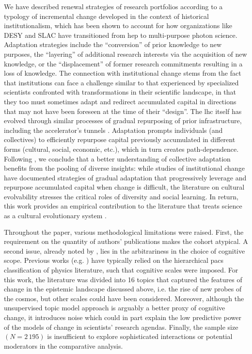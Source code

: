 \documentclass{article}
\begin{document}
We have described renewal strategies of research portfolios according to a typology of incremental change developed in the context of historical institutionalism, which has been shown to account for how organizations like DESY and SLAC have transitioned from \gls{hep} to multi-purpose photon science. Adaptation strategies include the ``conversion'' of prior knowledge to new purposes, the ``layering'' of additional research interests via the acquisition of new knowledge, or the ``displacement'' of former research commitments resulting in a loss of knowledge. The connection with institutional change stems from the fact that institutions can face a challenge similar to that experienced by specialized scientists confronted with transformations in their scientific landscape, in that they too must sometimes adapt and redirect accumulated capital in directions that may not have been foreseen at the time of their ``design''. The \gls{lhc} itself has evolved through similar processes of gradual repurposing of prior infrastructure, including the accelerator's tunnels \citep{Smith2015}. Adaptation prompts individuals (and collectives) to efficiently repurpose capital previously accumulated in different forms (cultural, social, economic, etc.), which in turn creates path-dependence. Following \citealt{Galesic2023}, we conclude that a better understanding of collective adaptation benefits from the pooling of diverse insights: while studies of institutional change have documented strategies of gradual adaptation that progressively leverage and repurpose accumulated capital when change is difficult, the literature on cultural evolvability stresses the critical roles of diversity and social learning. In return, this work provides an empirical contribution to the literature that treats science as a cultural evolutionary system \citep{Wu2023}.

Throughout the paper, various methodological limitations were raised. First, the requirement on the quantity of authors' publications makes the cohort atypical. A second issue, already noted by \citet{Gieryn1978}, lies in the arbitrariness in the choice of cognitive scope. Previous works (e.g. \citealt{Jia2017,Aleta2019,Tripodi2020}) have typically relied on the hierarchical \gls{pacs} classification of physics literature, such that cognitive scales were imposed. For this work, the literature was divided into 16 topics that captured the features of change in the epistemic landscape discussed above, i.e. the rise of new probes of the cosmos, but other scales could have been considered. %
Moreover, although the unsupervised topic model approach is arguably a better proxy of cognitive change, it introduces noise which could in part explain the low predictive power of the models of change in scientists' research agendas. Finally, the sample size $(N=2\,195)$ is insufficient to explore sophisticated interactions or potential moderators in the comparative analysis.
\end{document}
